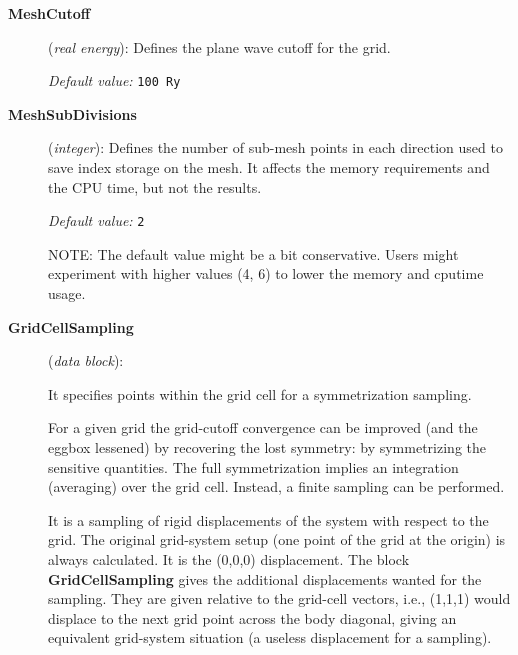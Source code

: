 \begin{description}

\item[\textbf{MeshCutoff}] (\textit{real energy}):
Defines the plane wave cutoff for the grid.

 
\textit{Default value:} \texttt{100 Ry}

\item[\textbf{MeshSubDivisions}] (\textit{integer}):
Defines the number of sub-mesh points in each direction used
to save index storage on the mesh. It affects the memory
requirements and the CPU time, but not the results. 

\textit{Default value:} \texttt{2}

NOTE: The default value might be a bit conservative. Users might
experiment with higher values (4, 6) to lower the memory and cputime
usage.

\item[\textbf{GridCellSampling}] (\textit{data block}):

It specifies points within the grid cell for a symmetrization sampling.

For a given grid the grid-cutoff convergence can be improved (and the
eggbox lessened) by recovering the lost symmetry: by symmetrizing the
sensitive quantities. The full symmetrization implies an integration
(averaging) over the grid cell. Instead, a finite sampling can be
performed.

It is a sampling of rigid displacements of the system with respect
to the grid. The original grid-system setup (one point of the grid
at the origin) is always calculated. It is the (0,0,0) displacement.
The block \textbf{GridCellSampling} gives the additional displacements
wanted for the sampling. They are given relative to the grid-cell
vectors, i.e., (1,1,1) would displace to the next grid point across
the body diagonal, giving an equivalent grid-system situation
(a useless displacement for a sampling).


\end{description}
